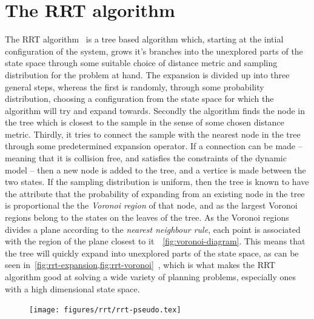 \section{The RRT algorithm}
\label{sec:rrt-algorithm-intro}

The \ac{RRT} algorithm~\cite[LaValle]{article} is a tree based algorithm which,
starting at the intial configuration of the system, grows it's branches into the
unexplored parts of the state space through some suitable choice of distance
metric and sampling distribution for the problem at hand. The expansion is
divided up into three general steps, whereas the first is randomly, through some
probability distribution, choosing a configuration from the state space for
which the algorithm will try and expand towards. Secondly the algorithm finds
the node in the tree which is closest to the sample in the sense of some chosen
distance metric. Thirdly, it tries to connect the sample with the nearest node
in the tree through some predetermined expansion operator. If a connection can
be made -- meaning that it is collision free, and satisfies the constraints of
the dynamic model -- then a new node is added to the tree, and a vertice is made
between the two states. If the sampling distribution is uniform, then the tree
is known to have the attribute that the probability of expanding from an
existing node in the tree is proportional the the \textit{Voronoi region} of
that node, and as the largest Voronoi regions belong to the states on the leaves
of the tree. As the Voronoi regions divides a plane according to the
\textit{nearest neighbour rule}, each point is associated with the region of the
plane closest to
it~\cite{aurenhammerVoronoiDiagramsSurvey1991}~\cref{fig:voronoi-diagram}. This
means that the tree will quickly expand into unexplored parts of the state
space, as can be seen in~\cref{fig:rrt-expansion,fig:rrt-voronoi}~\cite{Lav06},
which is what makes the \ac{RRT} algorithm good at solving a wide variety of
planning problems, especially ones with a high dimensional state space.

\begin{figure}
  \centering \texttt{[image: figures/rrt/rrt-pseudo.tex]}
\end{figure}

